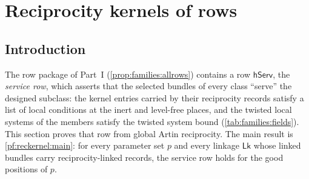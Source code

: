 \section{Reciprocity kernels of rows}\label{sec:pf:reckernel}

\providecommand{\reckKur}{\widehat{\mathbb{Q}}{}_\ell^{\mathrm{ur}}}
\providecommand{\reckKurp}{\widehat{\mathbb{Q}}{}_p^{\mathrm{ur}}}
\providecommand{\reckCl}{\mathbb{C}_\ell}
\providecommand{\reckRow}{\sfname{Row}}
\providecommand{\reckRowE}{\mathrm{Ev}_{\mathrm{lk}}}
\providecommand{\reckAtAll}{\mathrm{All}}
\providecommand{\reckClosed}{\sfname{Closed}}
\providecommand{\reckEvP}{\mathrm{Ev}_{\mathrm{par}}}
\providecommand{\reckServH}{\mathrm{SK}}
\providecommand{\reckLk}{\mathsf{Lk}}
\providecommand{\reckBd}{\mathsf{Bd}}
\providecommand{\reckm}{\mathfrak{m}}
\providecommand{\reckart}{\operatorname{art}}

\subsection{Introduction}\label{pf:reckernel:sec-intro}

The row package of Part~I (\cref{prop:families:allrows}) contains a row $\mathsf{hServ}$, the \emph{service
row}, which asserts that the selected bundles of every class ``serve'' the designed subclass: the kernel
entries carried by their reciprocity records satisfy a list of local conditions at the inert and level-free
places, and the twisted local systems of the members satisfy the twisted system bound
(\cref{tab:families:fields}). This section proves that row from global Artin reciprocity. The main result is
\cref{pf:reckernel:main}: for every parameter set $p$ and every linkage $\reckLk$ whose linked bundles carry
reciprocity-linked records, the service row holds for the good positions of $p$.


